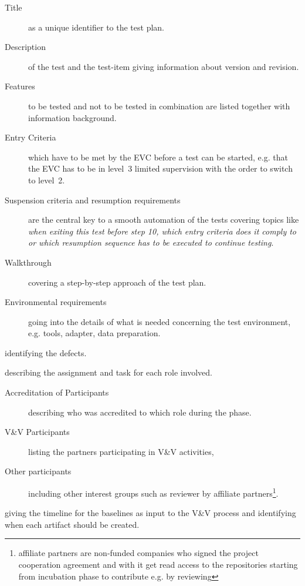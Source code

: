 \documentclass{template/openetcs_report}
\begin{document}
{\begin{description}
\begin{description} 
\item[Title] as a unique identifier to the test plan.
\item[Description] of the test and the test-item giving information
  about version and revision. 
\item[Features] to be tested and not to be tested in combination are
  listed together with information background.  
\item[Entry Criteria] which have to be met by the EVC before a test
  can be started, e.g. that the EVC has to be in level~3 limited
  supervision with the order to switch to level~2. 
\item[Suspension criteria and resumption requirements] are the central
  key to a smooth automation of the tests covering topics like
  \emph{when exiting this test before step 10, which entry criteria
    does it comply to or which resumption sequence has to be executed
    to continue testing}. 
\item[Walkthrough] covering a step-by-step approach of the test plan.
\item[Environmental requirements] going into the details of what is
  needed concerning the test environment, e.g. tools, adapter, data
  preparation. 
\end{description}

\item[Discrepancy Reports] identifying the defects.
\item[Key Participants] describing the assignment and task for each
  role involved.  

\begin{description}
\item[Accreditation of Participants] describing who was accredited to
  which role during the \VV phase. 
\item[V\&V Participants] listing the partners participating in V\&V activities,
\item[Other participants] including other interest groups such as
  reviewer by affiliate partners\footnote{affiliate partners are
    non-funded companies who signed the project cooperation agreement
    and with it get read access to the repositories starting from
    incubation phase to contribute e.g. by reviewing}. 
\end{description}

\item[Timeline] giving the timeline for the baselines as input to the
  V\&V process and identifying when each artifact should be created. 
\end{description}
}
\end{document}

